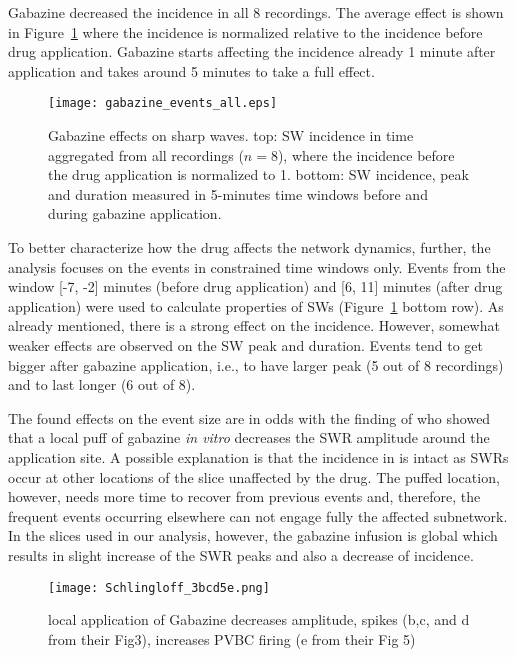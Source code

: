    Gabazine decreased the incidence in all 8 recordings. The average
    effect is shown in Figure~\ref{fig:gabazine_sum} where the incidence is
    normalized relative to the incidence before drug application. Gabazine
    starts affecting the incidence already 1 minute after application and takes
    around 5 minutes to take a full effect. 
    
    \begin{figure}
      \texttt{[image: gabazine\_events\_all.eps]}
      \caption{
        Gabazine effects on sharp waves. top: SW incidence in time aggregated
        from all recordings ($n=8$), where the incidence before the drug
        application is normalized to 1. bottom: SW incidence, peak and duration
        measured in 5-minutes time windows before and during gabazine
        application.
      }
      \label{fig:gabazine_sum}
    \end{figure}

    To better characterize how the drug affects the network dynamics, further,
    the analysis focuses on the events in constrained time windows only. Events
    from the window [-7, -2] minutes (before drug application) and [6, 11]
    minutes (after drug application) were used to calculate properties of SWs
    (Figure~\ref{fig:gabazine_sum} bottom row). As already mentioned, there is a
    strong effect on the incidence. However, somewhat weaker effects are
    observed on the SW peak and duration. Events tend to get bigger after
    gabazine application, i.e., to have larger peak (5 out of 8 recordings) and
    to last longer (6 out of 8). 

    The found effects on the event size are in odds with the finding of
    \citep{Schlingloff2014} who showed that a local puff of gabazine \textit{in
    vitro} decreases the SWR amplitude around the application site. A possible
    explanation is that the incidence in \citep{Schlingloff2014} is intact as
    SWRs occur at other locations of the slice unaffected by the drug. The
    puffed location, however, needs more time to recover from previous events
    and, therefore, the frequent events occurring elsewhere can not engage
    fully the affected subnetwork. In the slices used in our analysis, however,
    the gabazine infusion is global which results in slight increase of the SWR
    peaks and also a decrease of incidence.
    
    \begin{figure}
      \texttt{[image: Schlingloff\_3bcd5e.png]}
      \caption{local application of Gabazine decreases amplitude, spikes (b,c,
        and d from their Fig3), increases PVBC firing (e from their Fig 5)
            }
    \label{fig:schlingloff_gabazine}
    \end{figure}

